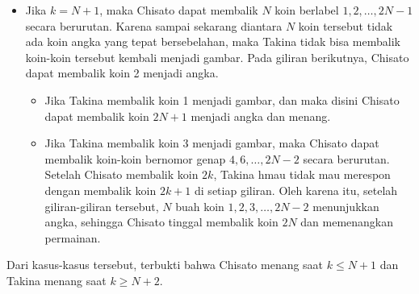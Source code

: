 \documentclass[12pt]{scrartcl}
\begin{document}
\begin{soaljawab}
\begin{solusi}
\begin{itemize}
        \item Jika $k = N+1$, maka Chisato dapat membalik $N$ koin berlabel $1,2,\dots,2N-1$ secara berurutan. Karena sampai sekarang diantara $N$ koin tersebut tidak ada koin angka yang tepat bersebelahan, maka Takina tidak bisa membalik koin-koin tersebut kembali  menjadi gambar. Pada giliran berikutnya, Chisato dapat membalik koin 2 menjadi angka. 
        \begin{itemize}
            \item Jika Takina membalik koin 1 menjadi gambar, dan maka disini Chisato dapat membalik koin $2N+1$ menjadi angka dan menang.
            \item Jika Takina membalik koin 3 menjadi gambar, maka Chisato dapat membalik koin-koin bernomor genap $4,6,\dots,2N-2$ secara berurutan. Setelah Chisato membalik koin $2k$, Takina hmau tidak mau merespon dengan membalik koin $2k+1$ di setiap giliran. Oleh karena itu, setelah giliran-giliran tersebut,  $N$ buah koin $1,2,3,\dots, 2N-2$ menunjukkan angka, sehingga Chisato tinggal membalik koin $2N$ dan memenangkan permainan.
        \end{itemize}
        \end{itemize}
        Dari kasus-kasus tersebut, terbukti bahwa Chisato menang saat $k \le N+1$ dan Takina menang saat $k \ge N+2$.
    \end{solusi}
\end{soaljawab}
\end{document}
